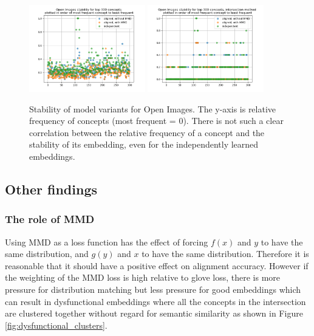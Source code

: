 \begin{figure}[H]
    \centering
    \includegraphics[width=0.45\textwidth]{images/results/openimages_stability.png}
    \includegraphics[width=0.45\textwidth]{images/results/openimages_stability_ixn.png}
    \caption{
        Stability of model variants for Open Images. The y-axis is relative frequency of concepts (most frequent = 0). There is not such a clear correlation between the relative frequency of a concept and the stability of its embedding, even for the independently learned embeddings. 
    }
\end{figure}



\subsection{Other findings}
\subsubsection{The role of MMD}

Using MMD as a loss function has the effect of forcing $f(x)$ and $y$ to have the same distribution, and  $g(y)$ and $x$ to have the same distribution. Therefore it is reasonable that it should have a positive effect on alignment accuracy. However if the weighting of the MMD loss is high relative to glove loss, there is more pressure for distribution  matching but less pressure for good embeddings which can result in dysfunctional embeddings where all the concepts in the intersection are clustered together without regard for semantic similarity as shown in Figure \ref{fig:dysfunctional_clusters}. 

